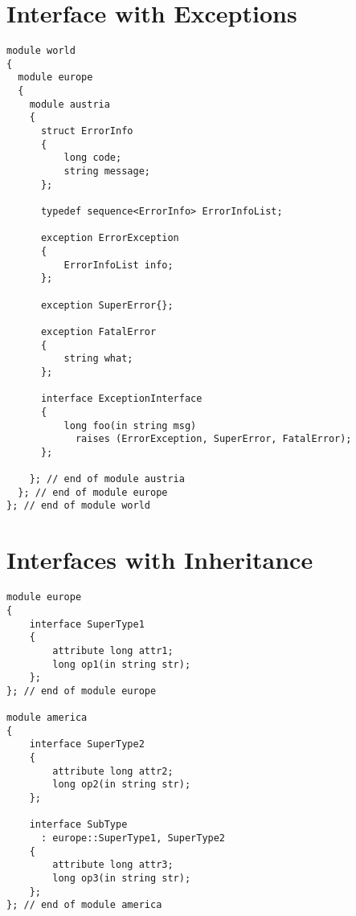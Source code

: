 \section{Interface with Exceptions}
\begin{small}
\begin{verbatim}
module world 
{
  module europe 
  {
    module austria 
    {      
      struct ErrorInfo
      {
          long code;
          string message;
      };
      
      typedef sequence<ErrorInfo> ErrorInfoList;
      
      exception ErrorException
      {
          ErrorInfoList info;
      };
      
      exception SuperError{};

      exception FatalError
      {
          string what;
      };
      
      interface ExceptionInterface
      {
          long foo(in string msg)
            raises (ErrorException, SuperError, FatalError);
      };

    }; // end of module austria
  }; // end of module europe
}; // end of module world
\end{verbatim}
\end{small}






\section{Interfaces with Inheritance}
\begin{small}
\begin{verbatim}
module europe
{
    interface SuperType1
    {
        attribute long attr1;
        long op1(in string str);
    };
}; // end of module europe

module america
{
    interface SuperType2
    {
        attribute long attr2;
        long op2(in string str);
    };

    interface SubType 
      : europe::SuperType1, SuperType2 
    {
        attribute long attr3;
        long op3(in string str);
    };
}; // end of module america
\end{verbatim}
\end{small}


